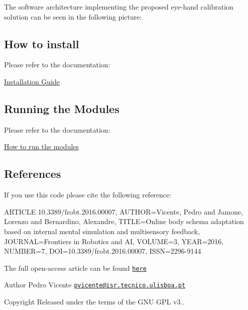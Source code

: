 The software architecture implementing the proposed eye-\/hand calibration solution can be seen in the following picture\+:

 

\subsection*{How to install}

Please refer to the documentation\+:

\hyperlink{installation}{Installation Guide}

\subsection*{Running the Modules}

Please refer to the documentation\+:

\hyperlink{how_to_use}{How to run the modules}

\subsection*{References}

If you use this code please cite the following reference\+: \begin{DoxyVerb}ARTICLE{ 10.3389/frobt.2016.00007,
AUTHOR={Vicente, Pedro  and  Jamone, Lorenzo  and  Bernardino, Alexandre},
TITLE={Online body schema adaptation based on internal mental simulation and multisensory feedback},
JOURNAL={Frontiers in Robotics and AI},
VOLUME={3},
YEAR={2016},
NUMBER={7},
DOI={10.3389/frobt.2016.00007},
ISSN={2296-9144}
}
\end{DoxyVerb}


The full open-\/access article can be found \href{https://doi.org/10.3389/frobt.2016.00007}{\tt here}

\begin{DoxyAuthor}{Author}
Pedro Vicente \href{mailto:pvicente@isr.tecnico.ulisboa.pt}{\tt pvicente@isr.\+tecnico.\+ulisboa.\+pt} 
\end{DoxyAuthor}
\begin{DoxyCopyright}{Copyright}
Released under the terms of the G\+NU G\+PL v3.. 
\end{DoxyCopyright}
